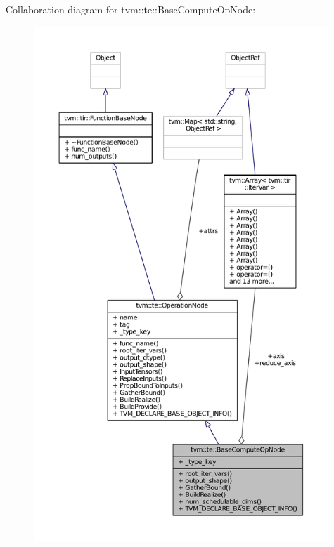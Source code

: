 Collaboration diagram for tvm\+:\+:te\+:\+:Base\+Compute\+Op\+Node\+:
\nopagebreak
\begin{figure}[H]
\begin{center}
\leavevmode
\includegraphics[height=550pt]{classtvm_1_1te_1_1BaseComputeOpNode__coll__graph}
\end{center}
\end{figure}

